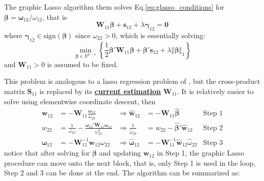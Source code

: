 \documentclass[twoside]{article}
\begin{document}
The graphic Lasso algorithm them solves Eq.\ref{eq:glasso_conditions} for $\boldsymbol{\beta}=\boldsymbol{\omega}_{12}/\omega_{12}$, that is
$$
\mathbf{W}_{11}\boldsymbol{\beta} + \mathbf{s}_{12} + \lambda\boldsymbol{\gamma}_{12} = \mathbf{0}
$$
where $\boldsymbol{\gamma}_{12}\in\mathrm{sign}(\boldsymbol{\beta})$ since $\omega_{22}>0$, which is essentially solving:
$$
\min_{\boldsymbol{\beta}\in\mathbb{R}^{p-1}}\left\{ \frac{1}{2}\boldsymbol{\beta}'\mathbf{W}_{11}\boldsymbol{\beta} + \boldsymbol{\beta}'\mathbf{s}_{12} + \lambda\left\Vert \boldsymbol{\beta} \right\Vert _1 \right\}
$$
and $\mathbf{W}_{11}>0$ is assumed to be fixed. 

This problem is analogous to a lasso regression problem of , but the cross-product matrix $\mathbf{S}_{11}$ is replaced by its \textbf{\underline{current estimation}} $\mathbf{W}_{11}$. It is relatively easier to solve using elementwise coordinate descent, then
\begin{align*}
    \mathbf{w}_{12} &= -\mathbf{W}_{11}\frac{\boldsymbol{\omega}_{12}}{\omega_{22}} &\Rightarrow \hat{\mathbf{w}}_{12} &= -\mathbf{W}_{11}\hat{\boldsymbol{\beta}} & \text{Step 1}\\
    w_{22} &= \frac{1}{\omega_{22}}-\frac{\boldsymbol{\omega}_{12}'\mathbf{W}_{11}\boldsymbol{\omega}_{12}}{\omega^2_{22}} &\Rightarrow \frac{1}{\hat{\omega}_{22}} &= w_{22} - \hat{\boldsymbol{\beta}}'\hat{\mathbf{w}}_{12} & \text{Step 2} \\
    \boldsymbol{\omega}_{12} &= -\mathbf{W}_{11}^{-1}\mathbf{w}_{12}\omega_{22} &\Rightarrow \hat{\boldsymbol{\omega}}_{12} &= -\mathbf{W}^{-1}_{11}\hat{\mathbf{w}}_{12}\hat{\omega}_{22} & \text{Step 3}
\end{align*}
notice that after solving for $\boldsymbol{\beta}$ and updating $\mathbf{w}_{12}$ in Step 1, the graphic Lasso procedure can move onto the next block, that is, only Step 1 is used in the loop, Step 2 and 3 can be done at the end. The algorithm can be summarized as:
\end{document}
